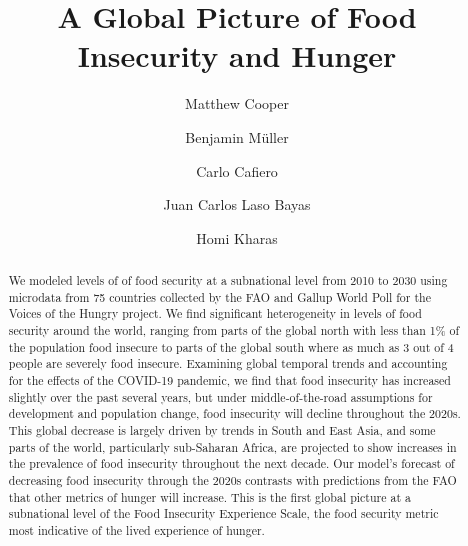 \documentclass{article}
\begin{document}
\title{A Global Picture of Food Insecurity and Hunger}

\author[1,2,*]{Matthew Cooper}
\author[2,3]{Benjamin Müller}
\author[4]{Carlo Cafiero}
\author[2,5]{Juan Carlos Laso Bayas}
\author[2,6]{Homi Kharas}


\maketitle
\begin{abstract}
We modeled levels of of food security at a subnational level from 2010 to 2030 using microdata from 75 countries collected by the FAO and Gallup World Poll for the Voices of the Hungry project.  We find significant heterogeneity in levels of food security around the world, ranging from parts of the global north with less than 1\% of the population food insecure to parts of the global south where as much as 3 out of 4 people are severely food insecure.  Examining global temporal trends and accounting for the effects of the COVID-19 pandemic, we find that food insecurity has increased slightly over the past several years, but under middle-of-the-road assumptions for development and population change, food insecurity will decline throughout the 2020s.  This global decrease is largely driven by trends in South and East Asia, and some parts of the world, particularly sub-Saharan Africa, are projected to show increases in the prevalence of food insecurity throughout the next decade. Our model's forecast of decreasing food insecurity through the 2020s contrasts with predictions from the FAO that other metrics of hunger will increase.  This is the first global picture at a subnational level of the Food Insecurity Experience Scale, the food security metric most indicative of the lived experience of hunger.
\end{abstract}
\end{document}
